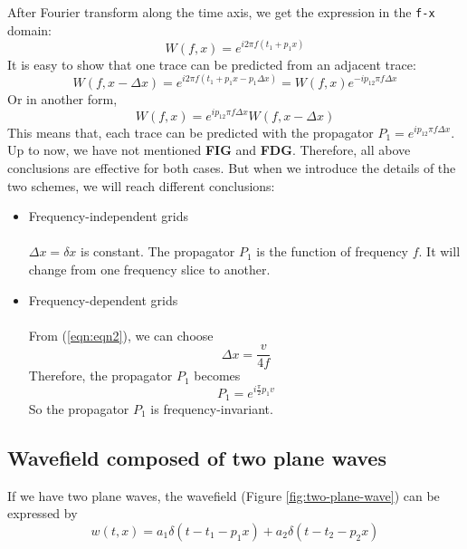 After Fourier transform along the time axis, we get the expression in the 
{\tt f-x} domain: 
\begin{equation}
	W(f,x) = e^{i2\pi f (t_1+p_1x)}
\end{equation}
It is easy to show that one trace can be predicted from an adjacent trace:
\begin{equation}
	W(f,x-\Delta x)=e^{i2\pi f (t_1+p_1x-p_1\Delta x)}=W(f,x)e^{-ip_12\pi f \Delta x}
\end{equation}
Or in another form,
\begin{equation}
	W(f,x)=e^{ip_12\pi f \Delta x}W(f,x-\Delta x)
\end{equation}
This means that, each trace can be predicted with the propagator 
$P_1=e^{ip_12\pi f \Delta x}$. Up to now, we have not mentioned {\bf FIG} 
and {\bf FDG}. Therefore, all above conclusions are effective for both cases. 
But when we introduce the details of the two schemes, we will reach different 
conclusions:
\begin{itemize}

	\item Frequency-independent grids \\ \\
	$\Delta x = \delta x$ is constant. The propagator $P_1$ is the function
	of frequency $f$. It will change from one frequency slice to 
	another.

	\item Frequency-dependent grids \\ \\
	From (\ref{eqn:eqn2}), we can choose
\begin{equation}
	\Delta x = \frac{v}{4 f}
\end{equation}
Therefore, the propagator $P_1$ becomes
\begin{equation}
	P_1 = e^{i\frac{\pi}{2}p_1v}
\end{equation}
So the propagator $P_1$ is frequency-invariant. 
\end{itemize}

\subsection{Wavefield composed of two plane waves}

If we have two plane waves, the wavefield (Figure \ref{fig:two-plane-wave}) can be 
expressed by
\begin{equation}
	w(t,x) = a_1\delta(t-t_1-p_1x)+a_2\delta(t-t_2-p_2x)
\end{equation}

